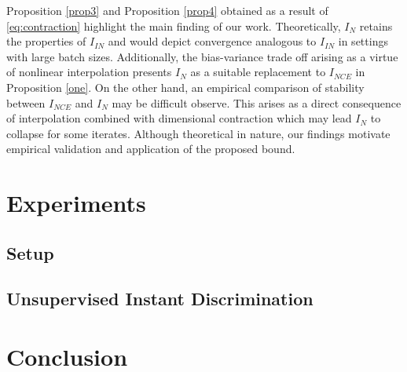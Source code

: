 \documentclass{article}
\begin{document}
Proposition \autoref{prop3} and Proposition \autoref{prop4} obtained as a result of \autoref{eq:contraction} highlight the main finding of our work. Theoretically, $I_{N}$ retains the properties of $I_{IN}$ and would depict convergence analogous to $I_{IN}$ in settings with large batch sizes. Additionally, the bias-variance trade off arising as a virtue of nonlinear interpolation presents $I_{N}$ as a suitable replacement to $I_{NCE}$ in Proposition \autoref{one}. On the other hand, an empirical comparison of stability between $I_{NCE}$ and $I_{N}$ may be difficult observe. This arises as a direct consequence of interpolation combined with dimensional contraction which may lead $I_{N}$ to collapse for some iterates. Although theoretical in nature, our findings motivate empirical validation and application of the proposed bound. 
\section{Experiments}
\subsection{Setup}

\subsection{Unsupervised Instant Discrimination}

\section{Conclusion}

 
\small{}

\newpage
\appendix
\end{document}
